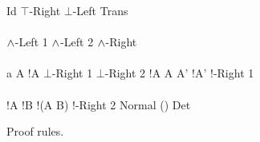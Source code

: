 \begin{FIGURE}
\begin{RULES}

  \ZEROPREMISERULENAMEDRIGHT
  {
    \phi \judge \phi
  }{Id}
    \qquad
  \ZEROPREMISERULENAMEDRIGHT
  {
    \phi \judge \top
  }{$\top$-Right}
    \qquad
  \ZEROPREMISERULENAMEDRIGHT
  {
    \bot \judge \phi
  }{$\bot$-Left}
    \qquad
  \TWOPREMISERULENAMEDRIGHT
  {
    \phi \judge \psi
  }
  {
    \psi \judge \xi
  }
  {
    \phi \judge \xi
  }{Trans}
    \\\\
  \ONEPREMISERULENAMEDRIGHT
  {
    \phi \judge \psi
  }
  {
    \phi \AND \xi \judge \psi
  }{$\land$-Left 1}
     \qquad
  \ONEPREMISERULENAMEDRIGHT
  {
    \phi \judge \psi
  }
  {
    \xi \AND \phi  \judge \psi
  }{$\land$-Left 2}
     \qquad
  \TWOPREMISERULENAMEDRIGHT
  {
    \phi \judge \psi
  }
  {
    \phi \judge \xi
  }
  {
    \phi \judge \psi \AND \xi
  }{$\land$-Right}
     \\\\
     \ONEPREMISERULENAMEDRIGHT
     {
       a \notin A
     }
     {
       !A \AND {} \judge \bot
     }{$\bot$-Right 1}
        \qquad
     \ZEROPREMISERULENAMEDRIGHT
     {
        \judge \bot
     }{$\bot$-Right 2}
     \qquad
     \TWOPREMISERULENAMEDRIGHT
     {
       \phi \judge !A
     }
     {
       A \subseteq A'
     }
     {
       \phi \judge!A'
     }{!-Right 1}
     \\\\
     \TWOPREMISERULENAMEDRIGHT
     {
       \phi \judge !A
     }
     {
       \phi \judge !B
     }
     {
       \phi \judge !(A \cap B)
     }{!-Right 2}
     \qquad
     \ONEPREMISERULENAMEDRIGHT
     {
       \phi \judge \psi
     }
     {
        \judge {}
     }{Normal}
     \qquad
     \ONEPREMISERULENAMEDRIGHT
     {
       \phi \judge {}\psi \land {}\xi
     }
     {
       \phi \judge {}(\psi \land \xi)
     }{Det}
\end{RULES}
\caption{Proof rules.}\label{figure:elAndBangRules}
\end{FIGURE}
